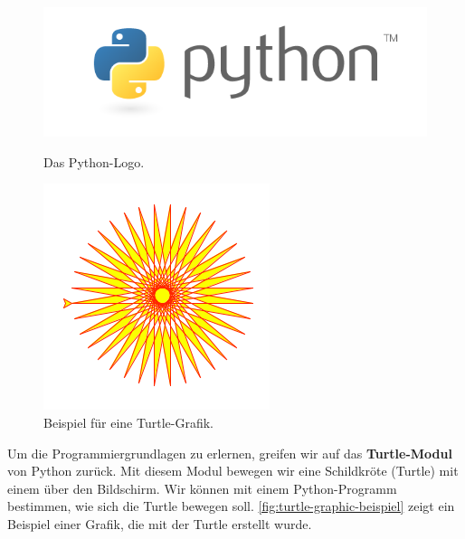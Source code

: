 \begin{figure}[htb]
    \centering
    \begin{minipage}[b][][b]{0.4\textwidth}
        \centering
        \includegraphics[scale=0.3]{python-logo}
        \caption{Das Python-Logo.\protect\footnotemark}
        \label{fig:python-logo}
    \end{minipage}
    \hfill
    \begin{minipage}[b][][b]{0.5\textwidth}
        \centering
        \includegraphics[scale=0.4]{turtle-star}
        \caption{Beispiel für eine Turtle-Grafik.\protect\footnotemark}
        \label{fig:turtle-graphic-beispiel}
    \end{minipage}
\end{figure}


Um die Programmiergrundlagen zu erlernen, greifen wir auf das \textbf{Turtle-Modul} von Python zurück.
Mit diesem Modul bewegen wir eine Schildkröte (Turtle) mit einem  über den Bildschirm.
Wir können mit einem Python-Programm bestimmen, wie sich die Turtle bewegen soll.
\autoref{fig:turtle-graphic-beispiel} zeigt ein Beispiel einer Grafik, die mit der Turtle erstellt wurde.